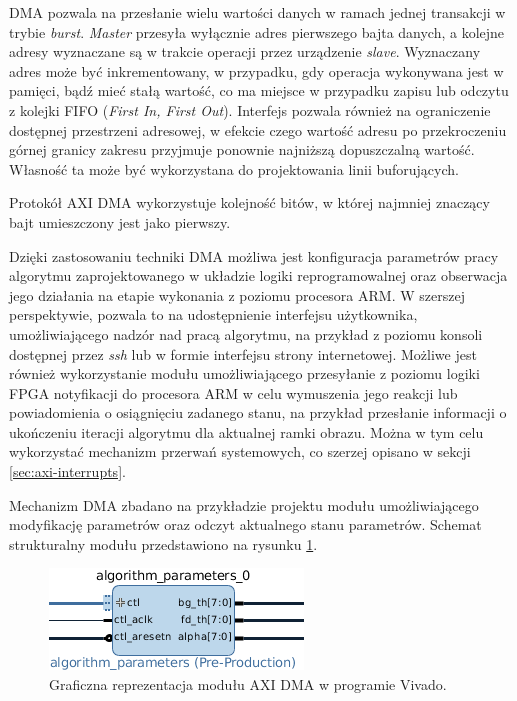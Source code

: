 DMA pozwala na przesłanie wielu wartości danych w ramach jednej transakcji w trybie \emph{burst}. \emph{Master} przesyła wyłącznie adres pierwszego bajta danych, a kolejne adresy wyznaczane są w trakcie operacji przez urządzenie \emph{slave}. Wyznaczany adres może być inkrementowany, w przypadku, gdy operacja wykonywana jest w pamięci, bądź mieć stałą wartość, co ma miejsce w przypadku zapisu lub odczytu z kolejki FIFO (\emph{First In, First Out}). Interfejs pozwala również na ograniczenie dostępnej przestrzeni adresowej, w efekcie czego wartość adresu po przekroczeniu górnej granicy zakresu przyjmuje ponownie najniższą dopuszczalną wartość. Własność ta może być wykorzystana do projektowania linii buforujących.

Protokół AXI DMA wykorzystuje kolejność bitów, w której najmniej znaczący bajt umieszczony jest jako pierwszy.

Dzięki zastosowaniu techniki DMA możliwa jest konfiguracja parametrów pracy algorytmu zaprojektowanego w układzie logiki reprogramowalnej oraz obserwacja jego działania na etapie wykonania z poziomu procesora ARM. W szerszej perspektywie, pozwala to na udostępnienie interfejsu użytkownika, umożliwiającego nadzór nad pracą algorytmu, na przykład z poziomu konsoli dostępnej przez \emph{ssh} lub w formie interfejsu strony internetowej. Możliwe jest również wykorzystanie modułu umożliwiającego przesyłanie z poziomu logiki FPGA notyfikacji do procesora ARM w celu wymuszenia jego reakcji lub powiadomienia o osiągnięciu zadanego stanu, na przykład przesłanie informacji o ukończeniu iteracji algorytmu dla aktualnej ramki obrazu. Można w tym celu wykorzystać mechanizm przerwań systemowych, co szerzej opisano w sekcji \ref{sec:axi-interrupts}.

Mechanizm DMA zbadano na przykładzie projektu modułu umożliwiającego modyfikację parametrów oraz odczyt aktualnego stanu parametrów. Schemat strukturalny modułu przedstawiono na rysunku \ref{fig:axi-dma-diagram}.

\begin{figure}[h]
	\centering
	\includegraphics[]{img/algorithm-parameters.png}
	\caption{Graficzna reprezentacja modułu AXI DMA w programie Vivado.}
	\label{fig:axi-dma-diagram}
\end{figure}

